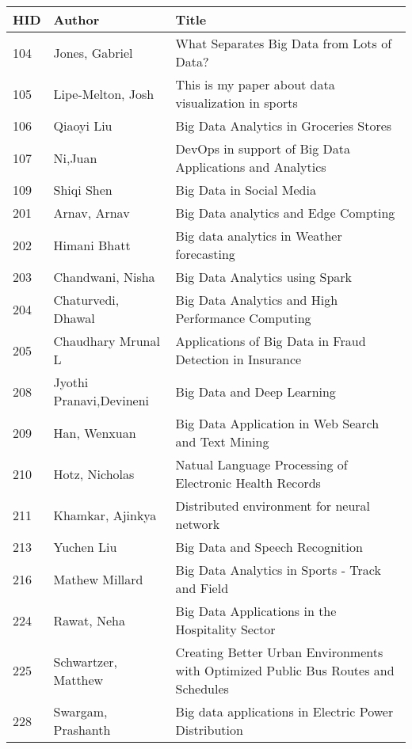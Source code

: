 \documentclass[12pt]{book}
\begin{document}
\begin{footnotesize}
\begin{longtable}{|p{1cm}p{5cm}p{9cm}|}
\hline \textbf{HID} & \textbf{Author} & \textbf{Title} \\ \hline \hline

\hline
\hline
104 & Jones, Gabriel & What Separates Big Data from Lots of Data?  \\
\hline
105 & Lipe-Melton, Josh & This is my paper about data visualization in sports  \\
\hline
106 & Qiaoyi Liu & Big Data Analytics in Groceries Stores  \\
\hline
107 & Ni,Juan & DevOps in support of Big Data Applications and Analytics  \\
\hline
109 & Shiqi Shen & Big Data in Social Media  \\
\hline
201 & Arnav, Arnav & Big Data analytics and Edge Compting  \\
\hline
202 & Himani Bhatt & Big data analytics in Weather forecasting  \\
\hline
203 & Chandwani, Nisha & Big Data Analytics using Spark  \\
\hline
204 & Chaturvedi, Dhawal & Big Data Analytics and High Performance Computing  \\
\hline
205 & Chaudhary Mrunal L & Applications of Big Data in Fraud Detection in Insurance  \\
\hline
208 & Jyothi Pranavi,Devineni & Big Data and Deep Learning  \\
\hline
209 & Han, Wenxuan & Big Data Application in Web Search and Text Mining  \\
\hline
210 & Hotz, Nicholas & Natual Language Processing of Electronic Health Records  \\
\hline
211 & Khamkar, Ajinkya & Distributed environment for neural network  \\
\hline
\hline
213 & Yuchen Liu & Big Data and Speech Recognition  \\
\hline
\hline
\hline
216 & Mathew Millard & Big Data Analytics in Sports - Track and Field  \\
\hline
\hline
\hline
224 & Rawat, Neha & Big Data Applications in the Hospitality Sector  \\
\hline
225 & Schwartzer, Matthew & Creating Better Urban Environments with Optimized Public Bus Routes and Schedules  \\
\hline
228 & Swargam, Prashanth & Big data applications in Electric Power Distribution  \\

\end{longtable}
\end{footnotesize}
\end{document}
